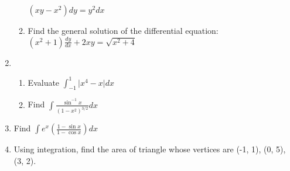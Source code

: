 \begin{enumerate}
\begin{enumerate}
	    $(xy-x^2)dy = y^2 dx$
 \item Find the general solution of the differential equation:\\ $(x^2 + 1)\frac{dy}{dx} + 2xy = \sqrt{x^2 + 4}$
        \end{enumerate}
	\item \begin{enumerate}
		    \item Evaluate $\int_{-1}^{1} \lvert x^4-x \rvert dx$
                    \item Find $\int \frac{\sin^{-1}x}{(1-x^2)^{3/2}} dx$
		    \end{enumerate}
		    \item Find $\int e^x \left(\frac{1-\sin x}{1-\cos x}\right) dx$
			    \item Using integration, find the area of triangle whose vertices are (-1, 1), (0, 5), (3, 2).
\end{enumerate}
